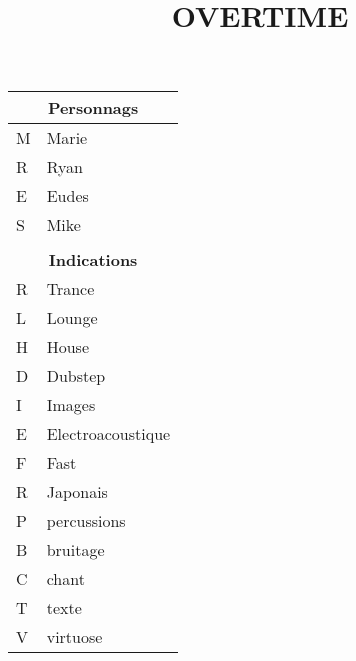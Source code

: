 \documentclass[a4paper]{article}
\title{OVERTIME}
\date{}
\author{}
\begin{document}
\maketitle

\begin{tabular}{|l|l|}\hline
\multicolumn{2}{|c|}{\textbf{Personnags}} \\\hline
M & Marie \\\hline
R & Ryan \\\hline
E & Eudes \\\hline
S & Mike \\\hline
\multicolumn{2}{|c|}{}\\\hline
\multicolumn{2}{|c|}{\textbf{Indications}} \\\hline
R & Trance \\\hline
L & Lounge \\\hline
H & House \\\hline
D & Dubstep \\\hline
I & Images \\\hline
E & Electroacoustique \\\hline
F & Fast \\\hline
R & Japonais \\\hline
P & percussions \\\hline
B & bruitage \\\hline
C & chant \\\hline
T & texte \\\hline
V & virtuose \\\hline
\end{tabular}
\end{document}
